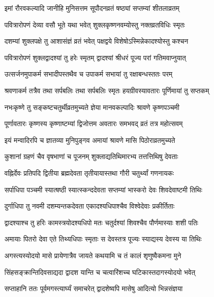 \twolineshloka
{इमां रौरवकल्यादि जानीहि मुनिसत्तम}
{सूपौदनव्रतं षष्ठ्यां सप्तम्यां शीतलाव्रतम्} %

\twolineshloka
{पवित्रारोपणं देव्या वसौ भूते यथा भवेत्}
{शुक्लकृष्णनवम्योस्तु नक्तव्रतविधिः स्मृतः} %

\twolineshloka
{दशम्यां शुक्लपक्षे तु आशासंज्ञं व्रतं भवेत्}
{पक्षद्वये विशेषोऽस्मिन्नेकादश्योस्तु कश्चन} %

\twolineshloka
{पवित्रारोपणं शुक्लद्वादश्यां तु हरेः स्मृतम्}
{द्वादश्यां श्रीधरं पूज्य परां गतिमवाप्नुयात्} %

\twolineshloka
{उत्सर्जनमुपाकर्म सभादीपस्तथैव च}
{उपाकर्म सभायां तु रक्षाबन्धस्ततः परम्} %

\twolineshloka
{श्रवणाकर्म तत्रैव तथा सर्पबलिः तथा सर्पबलिः स्मृतः}
{हयग्रीवस्यावतारः पूर्णिमायां तु सप्तकम्} %

\twolineshloka
{नभःकृष्णे तु सङ्कष्टचतुर्थीव्रतमुच्यते}
{ज्ञेया मानवकल्पादिः श्रावणे कृष्णपञ्चमी} %

\twolineshloka
{पूर्णावतारः कृष्णस्य कृष्णाष्टम्यां द्विजोत्तम}
{अवतारः समभवद् व्रतं तत्र महोत्सवम्} %

\twolineshloka
{इयं मन्वादिरपि च ज्ञातव्या मुनिपुङ्गव}
{अमायां श्रावणे मासि पिठोराव्रतमुच्यते} %

\twolineshloka
{कुशानां ग्रहणं चैव वृषभाणां च पूजनम्}
{शुक्लाद्यतिथिमारभ्य तत्तत्तिथिषु देवताः} %

\twolineshloka
{वह्निर्देवः प्रतिपदि द्वितीया ब्रह्मदेवता}
{तृतीयायास्तथा गौरी चतुर्थ्यां गणनायकः} %

\twolineshloka
{सर्पाधिपा पञ्चमी स्यात्षष्ठी स्यात्स्कन्ददेवता}
{सप्तम्यां भास्करो देवः शिवदेवाष्टमी तिथिः} %

\twolineshloka
{दुर्गाधिपा तु नवमी दशम्यन्तकदेवता}
{एकादश्यधिपाश्चैव विश्वेदेवाः प्रकीर्तिताः} %

\twolineshloka
{द्वादश्याश्च तु हरिः कामस्त्रयोदश्यधिपो मतः}
{चतुर्दश्यां शिवश्चैव पौर्णमास्याः शशी पतिः} %

\twolineshloka
{अमायाः पितरो देवा एते तिथ्यधिपाः स्मृताः}
{स देवस्तत्र पूज्यः स्याद्यस्य देवस्य या तिथिः} %

\twolineshloka
{अगस्त्यस्योदयो मासे प्रायेणात्रैव जायते}
{कथयामि च तं कालं शृणुष्वैकमना मुने} %

\twolineshloka
{सिंहसङ्क्रान्तिदिवसाद्यदा द्वादश यान्ति च}
{चत्वारिंशच्च घटिकास्तदागस्योदयो भवेत्} %

\twolineshloka
{सप्ताहानि ततः पूर्वमगस्त्यार्घ्यं समाचरेत्}
{द्वादशेष्वपि मासेषु आदित्यो भिन्नसंज्ञया} %

